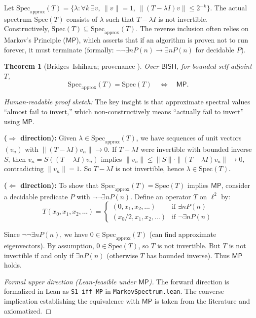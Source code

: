 \documentclass[11pt]{article}
\newcommand{\MP}{\mathsf{MP}}
\newcommand{\lean}[1]{\texttt{#1}}
\newcommand{\leanok}{\text{\tiny [✓ Lean]}}
\theoremstyle{plain}
\newtheorem{theorem}{Theorem}[section]
\theoremstyle{definition}
\theoremstyle{remark}
\newenvironment{hrproof}{\noindent\textit{Human-readable proof sketch:} }{}
\newcommand{\BISH}{\mathsf{BISH}}
\begin{document}
Let $\mathrm{Spec}_{\mathrm{approx}}(T)=\{\lambda:\forall k\ \exists v,\ \|v\|=1,\ \|(T-\lambda I)v\|\le 2^{-k}\}$.
The actual spectrum $\mathrm{Spec}(T)$ consists of $\lambda$ such that $T-\lambda I$ is not invertible.
Constructively, $\mathrm{Spec}(T) \subseteq \mathrm{Spec}_{\mathrm{approx}}(T)$. The reverse inclusion often relies on Markov's Principle ($\MP$), which asserts that if an algorithm is proven not to run forever, it must terminate (formally: $\neg\neg\exists n P(n) \to \exists n P(n)$ for decidable $P$).

\begin{theorem}[Bridges--Ishihara; provenance \cite{BridgesRichman}] \leanok
Over $\BISH$, for bounded self-adjoint $T$,
\[
\mathrm{Spec}_{\mathrm{approx}}(T)=\mathrm{Spec}(T)\quad \Longleftrightarrow\quad \MP.
\]
\end{theorem}

\begin{hrproof}
The key insight is that approximate spectral values ``almost fail to invert,'' which non-constructively means ``actually fail to invert'' using $\MP$. 

\textbf{($\Rightarrow$ direction):} Given $\lambda\in\mathrm{Spec}_{\mathrm{approx}}(T)$, we have sequences of unit vectors $(v_n)$ with $\|(T-\lambda I)v_n\| \to 0$. 
If $T-\lambda I$ were invertible with bounded inverse $S$, then $v_n = S((T-\lambda I)v_n)$ implies $\|v_n\| \leq \|S\| \cdot \|(T-\lambda I)v_n\| \to 0$, 
contradicting $\|v_n\|=1$. So $T-\lambda I$ is not invertible, hence $\lambda\in\mathrm{Spec}(T)$.

\textbf{($\Leftarrow$ direction):} To show that $\mathrm{Spec}_{\mathrm{approx}}(T) = \mathrm{Spec}(T)$ implies $\MP$, 
consider a decidable predicate $P$ with $\neg\neg\exists n P(n)$. Define an operator $T$ on $\ell^2$ by:
$$T(x_0, x_1, x_2, \ldots) = \begin{cases}
(0, x_1, x_2, \ldots) & \text{if } \exists n P(n) \\
(x_0/2, x_1, x_2, \ldots) & \text{if } \neg\exists n P(n)
\end{cases}$$

Since $\neg\neg\exists n P(n)$, we have $0 \in \mathrm{Spec}_{\mathrm{approx}}(T)$ (can find approximate eigenvectors).
By assumption, $0 \in \mathrm{Spec}(T)$, so $T$ is not invertible. 
But $T$ is not invertible if and only if $\exists n P(n)$ (otherwise $T$ has bounded inverse). 
Thus $\MP$ holds.
\end{hrproof}

\begin{proof}[Formal upper direction (Lean-feasible under $\MP$)]
The forward direction is formalized in Lean as \lean{S1\_iff\_MP} in \texttt{MarkovSpectrum.lean}.
The converse implication establishing the equivalence with $\MP$ is taken from the literature and axiomatized.
\end{proof}
\end{document}
